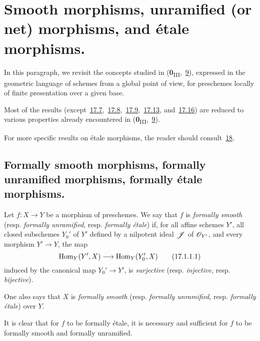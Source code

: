 \section{Smooth morphisms, unramified (or net) morphisms, and \'etale morphisms.}
\label{section:IV.17}

In this paragraph, we revisit the concepts studied in (\textbf{0}\textsubscript{III},~\hyperref[section:0.9]{9}), expressed in the geometric language of schemes from a global point of view, for preschemes locally of finite presentation over a given base.

Most of the results (except~\hyperref[subsection:IV.17.7]{17.7},~\hyperref[subsection:IV.17.8]{17.8},~\hyperref[subsection:IV.17.9]{17.9},~\hyperref[subsection:IV.17.13]{17.13}, and~\hyperref[subsection:IV.17.16]{17.16}) are reduced to various properties already encountered in (\textbf{0}\textsubscript{III},~\hyperref[section:0.9]{9}).

For more specific results on \'etale morphisms, the reader should consult~\textsection\hyperref[section:IV.18]{18}.

\subsection{Formally smooth morphisms, formally unramified morphisms, formally \'etale morphisms.}
\label{subsection:IV.17.1}

\begin{definition}[17.1.1]
\label{IV.17.1.1}
Let $f:X\to Y$ be a morphism of preschemes.
We say that $f$ is \emph{formally smooth} (resp. \emph{formally unramified}, resp. \emph{formally \'etale}) if, for all affine schemes $Y'$, all closed subschemes $Y_0'$ of $Y'$ defined by a nilpotent ideal $\mathscr{J}$ of $\mathscr{O}_{Y'}$, and every morphism $Y'\to Y$, the map 
\[
\label{IV.17.1.1.1}
  \Hom_Y(Y',X)\to\Hom_Y(Y_0',X)
  \tag{17.1.1.1}
\]
induced by the canonical map $Y_0'\to Y'$, is \emph{surjective} (resp. \emph{injective}, resp. \emph{bijective}).

One also says that $X$ is \emph{formally smooth} (resp. \emph{formally unramified}, resp. \emph{formally \'etale}) over $Y$.

It is clear that for $f$ to be formally \'etale, it is necessary and sufficient for $f$ to be formally smooth and formally unramified.
\end{definition}

